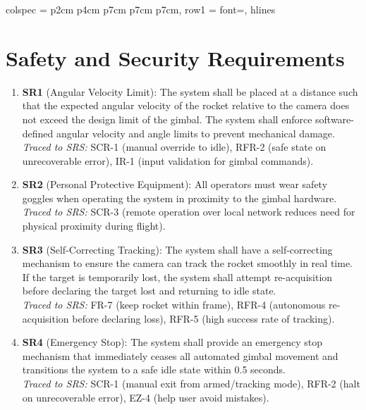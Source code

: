 \documentclass{article}
\begin{document}
\begin{table}[htbp]
{\begin{tblr}{
        colspec = {p{2cm} p{4cm} p{7cm} p{7cm} p{7cm}},
        row{1} = {font=\bfseries},
        hlines
      }
    \end{tblr}
  }
\end{table}

\newpage
\section{Safety and Security Requirements}

\begin{enumerate}
  \item \textbf{SR1} (Angular Velocity Limit): The system shall be placed at a distance
        such that the expected angular velocity of the rocket relative to the camera
        does not exceed the design limit of the gimbal. The system shall enforce
        software-defined angular velocity and angle limits to prevent mechanical
        damage.\\
        \textit{Traced to SRS:} SCR-1 (manual override to idle), RFR-2 (safe state on
        unrecoverable error), IR-1 (input validation for gimbal commands).

  \item \textbf{SR2} (Personal Protective Equipment): All operators must wear safety
        goggles when operating the system in proximity to the gimbal hardware.\\
        \textit{Traced to SRS:} SCR-3 (remote operation over local network reduces need
        for physical proximity during flight).

  \item \textbf{SR3} (Self-Correcting Tracking): The system shall have a self-correcting
        mechanism to ensure the camera can track the rocket smoothly in real time.
        If the target is temporarily lost, the system shall attempt re-acquisition
        before declaring the target lost and returning to idle state.\\
        \textit{Traced to SRS:} FR-7 (keep rocket within frame), RFR-4
        (autonomous re-acquisition before declaring loss), RFR-5 (high success
        rate of tracking).

  \item \textbf{SR4} (Emergency Stop): The system shall provide an emergency stop
        mechanism that immediately ceases all automated gimbal movement and
        transitions the system to a safe idle state within 0.5 seconds.\\
        \textit{Traced to SRS:} SCR-1 (manual exit from armed/tracking mode),
        RFR-2 (halt on unrecoverable error), EZ-4 (help user avoid mistakes).
\end{enumerate}
\end{document}
